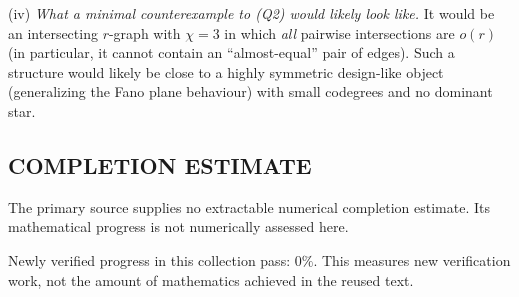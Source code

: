 (iv) \emph{What a minimal counterexample to (Q2) would likely look like.} It would be an intersecting $r$-graph with $\chi=3$ in which \emph{all} pairwise intersections are $o(r)$ (in particular, it cannot contain an ``almost-equal'' pair of edges). Such a structure would likely be close to a highly symmetric design-like object (generalizing the Fano plane behaviour) with small codegrees and no dominant star.




\subsection*{COMPLETION ESTIMATE}
The primary source supplies no extractable numerical completion estimate. Its mathematical progress is not numerically assessed here.

Newly verified progress in this collection pass: $0\%$. This measures new verification work, not the amount of mathematics achieved in the reused text.
